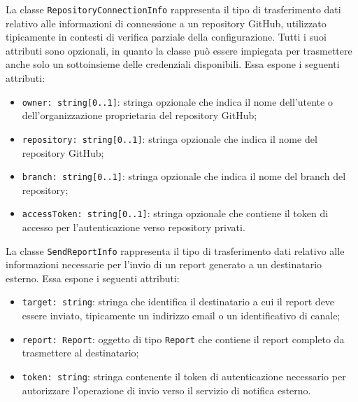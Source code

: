 \documentclass[a4paper, 11pt]{article}
\newcounter{subsubsubsection}[subsubsection]
\begin{document}
\label{sec:RepositoryConnectionInfo}

La classe \texttt{RepositoryConnectionInfo} rappresenta il tipo di trasferimento dati relativo
alle informazioni di connessione a un repository GitHub, utilizzato tipicamente in contesti di
verifica parziale della configurazione. Tutti i suoi attributi sono opzionali, in quanto la classe
può essere impiegata per trasmettere anche solo un sottoinsieme delle credenziali disponibili.
Essa espone i seguenti attributi:

\begin{itemize}
  \item \texttt{owner: string[0..1]}: stringa opzionale che indica il nome dell'utente o
    dell'organizzazione proprietaria del repository GitHub;

  \item \texttt{repository: string[0..1]}: stringa opzionale che indica il nome del repository
    GitHub;

  \item \texttt{branch: string[0..1]}: stringa opzionale che indica il nome del branch del
    repository;

  \item \texttt{accessToken: string[0..1]}: stringa opzionale che contiene il token di accesso
    per l'autenticazione verso repository privati.
\end{itemize}

\label{sec:SendReportInfo}

La classe \texttt{SendReportInfo} rappresenta il tipo di trasferimento dati relativo alle
informazioni necessarie per l'invio di un report generato a un destinatario esterno. Essa espone
i seguenti attributi:

\begin{itemize}
  \item \texttt{target: string}: stringa che identifica il destinatario a cui il report deve essere
    inviato, tipicamente un indirizzo email o un identificativo di canale;

  \item \texttt{report: Report}: oggetto di tipo \texttt{Report} che contiene il report completo
    da trasmettere al destinatario;

  \item \texttt{token: string}: stringa contenente il token di autenticazione necessario per
    autorizzare l'operazione di invio verso il servizio di notifica esterno.
\end{itemize}
\end{document}
